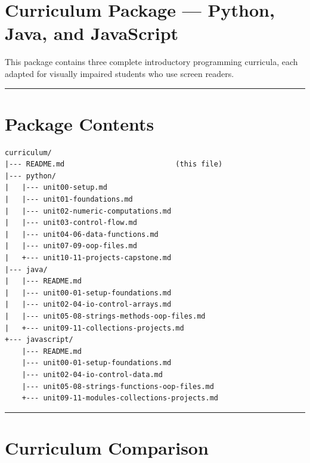 \section{Curriculum Package --- Python, Java, and
JavaScript}\label{curriculum-package-python-java-and-javascript}

This package contains three complete introductory programming curricula,
each adapted for visually impaired students who use screen readers.

\begin{center}\rule{0.5\linewidth}{0.5pt}\end{center}

\section{Package Contents}\label{package-contents}

\begin{verbatim}
curriculum/
|--- README.md                          (this file)
|--- python/
|   |--- unit00-setup.md
|   |--- unit01-foundations.md
|   |--- unit02-numeric-computations.md
|   |--- unit03-control-flow.md
|   |--- unit04-06-data-functions.md
|   |--- unit07-09-oop-files.md
|   +--- unit10-11-projects-capstone.md
|--- java/
|   |--- README.md
|   |--- unit00-01-setup-foundations.md
|   |--- unit02-04-io-control-arrays.md
|   |--- unit05-08-strings-methods-oop-files.md
|   +--- unit09-11-collections-projects.md
+--- javascript/
    |--- README.md
    |--- unit00-01-setup-foundations.md
    |--- unit02-04-io-control-data.md
    |--- unit05-08-strings-functions-oop-files.md
    +--- unit09-11-modules-collections-projects.md
\end{verbatim}

\begin{center}\rule{0.5\linewidth}{0.5pt}\end{center}

\section{Curriculum Comparison}\label{curriculum-comparison}

